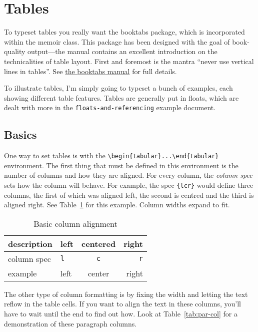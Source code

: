 \documentclass[article,oneside]{memoir}
\begin{document}
\chapter*{Tables}

To typeset tables you really want the \textsf{booktabs} package, which is incorporated within the \textsf{memoir} class. This package has been designed with the goal of book-quality output---the manual contains an excellent introduction on the technicalities of table layout. First and foremost is the mantra ``never use vertical lines in tables''. See \href{http://www.tug.org/tex-archive/macros/latex/contrib/booktabs/booktabs.pdf}{the \textsf{booktabs} manual} for full details.

To illustrate tables, I'm simply going to typeset a bunch of examples, each showing different table features. Tables are generally put in floats, which are dealt with more in the \texttt{floats-and-referencing} example document.

\section*{Basics}

One way to set tables is with the \verb|\begin{tabular}...\end{tabular}| environment. The first thing that must be defined in this environment is the number of columns and how they are aligned. For every column, the \emph{column spec} sets how the column will behave. For example, the spec \verb|{lcr}| would define three columns, the first of which was aligned left, the second is centred and the third is aligned right. See Table~\ref{tab:basic-align} for this example. Column widths expand to fit.

\begin{table}[htbp]
  \centering
  \begin{tabular}{llcr} %
    \toprule
    description & left & centered & right\\
    \midrule
    column spec & \texttt{l} & \texttt{c} & \texttt{r} \\
    \midrule
    example & left & center & right \\
    \bottomrule
  \end{tabular}
  \caption{Basic column alignment}
  \label{tab:basic-align}
\end{table}

The other type of column formatting is by fixing the width and letting the text reflow in the table cells. If you want to align the text in these columns, you'll have to wait until the end to find out how. Look at Table~\ref{tab:par-col} for a demonstration of these paragraph columns.
\end{document}
